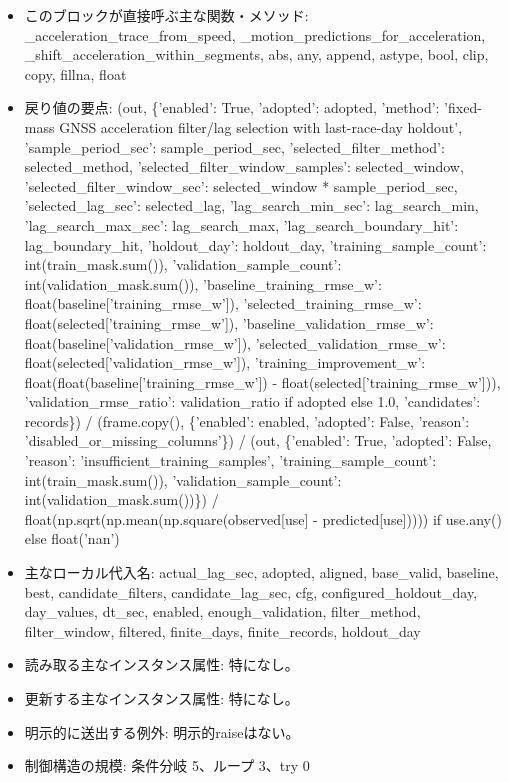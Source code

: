 \documentclass[a4paper,11pt]{article}
\begin{document}
\begin{itemize}[leftmargin=1.6em]
Vehicle mass remains fixed. Candidate observation filters and offsets are
fitted on all but the last race day and adopted only when the held-out last
day does not regress. This models quantized/asynchronous GNSS observations;
it is not a tunable vehicle force or a live-command filter.
              \item このブロックが直接呼ぶ主な関数・メソッド: \_acceleration\_trace\_from\_speed, \_motion\_predictions\_for\_acceleration, \_shift\_acceleration\_within\_segments, abs, any, append, astype, bool, clip, copy, fillna, float
              \item 戻り値の要点: (out, \{'enabled': True, 'adopted': adopted, 'method': 'fixed-mass GNSS acceleration filter/lag selection with last-race-day holdout', 'sample\_period\_sec': sample\_period\_sec, 'selected\_filter\_method': selected\_method, 'selected\_filter\_window\_samples': selected\_window, 'selected\_filter\_window\_sec': selected\_window * sample\_period\_sec, 'selected\_lag\_sec': selected\_lag, 'lag\_search\_min\_sec': lag\_search\_min, 'lag\_search\_max\_sec': lag\_search\_max, 'lag\_search\_boundary\_hit': lag\_boundary\_hit, 'holdout\_day': holdout\_day, 'training\_sample\_count': int(train\_mask.sum()), 'validation\_sample\_count': int(validation\_mask.sum()), 'baseline\_training\_rmse\_w': float(baseline['training\_rmse\_w']), 'selected\_training\_rmse\_w': float(selected['training\_rmse\_w']), 'baseline\_validation\_rmse\_w': float(baseline['validation\_rmse\_w']), 'selected\_validation\_rmse\_w': float(selected['validation\_rmse\_w']), 'training\_improvement\_w': float(float(baseline['training\_rmse\_w']) - float(selected['training\_rmse\_w'])), 'validation\_rmse\_ratio': validation\_ratio if adopted else 1.0, 'candidates': records\}) / (frame.copy(), \{'enabled': enabled, 'adopted': False, 'reason': 'disabled\_or\_missing\_columns'\}) / (out, \{'enabled': True, 'adopted': False, 'reason': 'insufficient\_training\_samples', 'training\_sample\_count': int(train\_mask.sum()), 'validation\_sample\_count': int(validation\_mask.sum())\}) / float(np.sqrt(np.mean(np.square(observed[use] - predicted[use])))) if use.any() else float('nan')
              \item 主なローカル代入名: actual\_lag\_sec, adopted, aligned, base\_valid, baseline, best, candidate\_filters, candidate\_lag\_sec, cfg, configured\_holdout\_day, day\_values, dt\_sec, enabled, enough\_validation, filter\_method, filter\_window, filtered, finite\_days, finite\_records, holdout\_day
              \item 読み取る主なインスタンス属性: 特になし。
              \item 更新する主なインスタンス属性: 特になし。
              \item 明示的に送出する例外: 明示的raiseはない。
              \item 制御構造の規模: 条件分岐 5、ループ 3、try 0
            \end{itemize}
\end{document}
